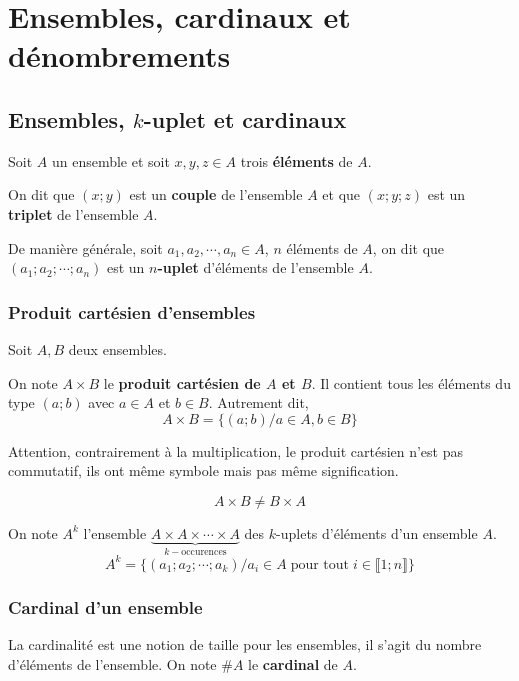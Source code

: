 \documentclass[french]{book}
\begin{document}
\tableofcontents


\chapter{Ensembles, cardinaux et dénombrements}
\section{Ensembles, $k$-uplet et cardinaux}
Soit $A$ un ensemble et soit $x,y,z\in A$ trois \textbf{éléments} de $A$. 

\begin{defn}
On dit que $(x;y)$ est un \textbf{couple} de l'ensemble $A$ et que $(x;y;z)$ est un \textbf{triplet} de l'ensemble $A$.\\

\par De manière générale, soit $a_1,a_2,\cdots,a_n \in A$, $n$ éléments de $A$, on dit que  $(a_1;a_2;\cdots;a_n) $ est un \textbf{$n$-uplet} d'éléments de  l'ensemble $A$.
\end{defn}

\subsection{Produit cartésien d'ensembles}
Soit $A,B$ deux ensembles.

\begin{defn}
On note $A \times B$ le\textbf{ produit cartésien de $A$ et $B$}. Il contient tous les éléments du type $(a;b)$ avec $a\in A$ et $b\in B$. Autrement dit,
$$A\times B=\{(a;b) / a \in A, b \in B \} $$ 
\end{defn} 

\begin{rem}
Attention, contrairement à la multiplication, le produit cartésien n'est pas commutatif, ils ont même symbole mais pas même signification. 

$$A \times B \neq B \times A$$ 
\end{rem}

\begin{defn}
On note $A^k$ l'ensemble $\underbrace{ A \times A \times \cdots  \times A }_{k-\text{occurences}} $ des $k$-uplets d’éléments d’un ensemble $A$. \\

$$ A^k=\{(a_1;a_2;\cdots;a_k)/ a_i \in A \; \text{pour tout} \; i\in \llbracket 1;n \rrbracket \} $$
\end{defn}

\subsection{Cardinal d'un ensemble}
\begin{defn}
La cardinalité est une notion de taille pour les ensembles, il s'agit du nombre d'éléments de l'ensemble. On note $\#A$ le \textbf{cardinal} de $A$.
\end{defn}
\end{document}
